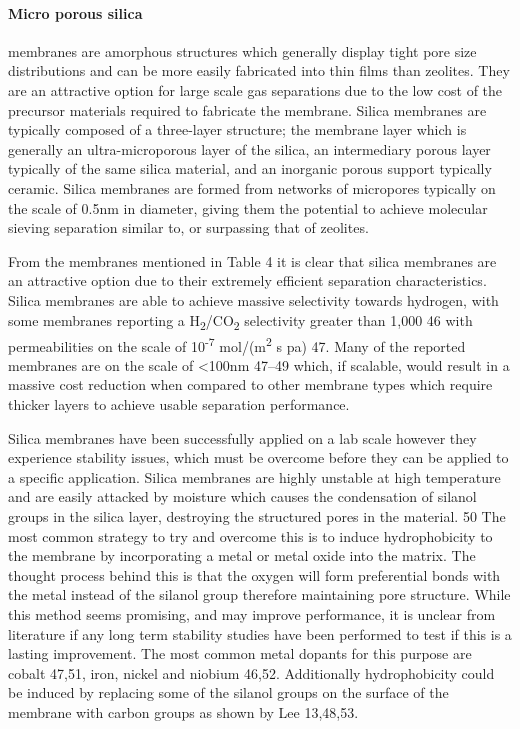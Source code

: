 \paragraph{Micro porous silica} membranes are amorphous structures which generally display tight pore 
size distributions and can be more easily fabricated into thin films than zeolites. They 
are an attractive option for large scale gas separations due to the low cost of the precursor 
materials required to fabricate the membrane. Silica membranes are typically composed of a 
three-layer structure; the membrane layer which is generally an ultra-microporous layer of 
the silica, an intermediary porous layer typically of the same silica material, and an 
inorganic porous support typically ceramic. Silica membranes are formed from networks of 
micropores typically on the scale of 0.5nm in diameter, giving them the potential to achieve 
molecular sieving separation similar to, or surpassing that of zeolites. 

From the membranes mentioned in Table 4 it is clear that silica membranes are an attractive 
option due to their extremely efficient separation characteristics. Silica membranes are able 
to achieve massive selectivity towards hydrogen, with some membranes reporting a H\textsubscript{2}/CO\textsubscript{2} 
selectivity greater than 1,000 46 with permeabilities on the scale of 10\textsuperscript{-7} mol/(m\textsuperscript{2} s pa) 
47. Many of the reported membranes are on the scale of \textless 100nm 47–49 which, if scalable, 
would result in a massive cost reduction when compared to other membrane types which require 
thicker layers to achieve usable separation performance. 

Silica membranes have been successfully applied on a lab scale however they experience 
stability issues, which must be overcome before they can be applied to a specific application. 
Silica membranes are highly unstable at high temperature and are easily attacked by moisture 
which causes the condensation of silanol groups in the silica layer, destroying the structured 
pores in the material. 50 The most common strategy to try and overcome this is to induce 
hydrophobicity to the membrane by incorporating a metal or metal oxide into the matrix.  
The thought process behind this is that the oxygen will form preferential bonds with the 
metal instead of the silanol group therefore maintaining pore structure. While this method 
seems promising, and may improve performance, it is unclear from literature if any long term 
stability studies have been performed to test if this is a lasting improvement. The most 
common metal dopants for this purpose are cobalt 47,51, iron, nickel and niobium 46,52. 
Additionally hydrophobicity could be induced by replacing some of the silanol groups on the 
surface of the membrane with carbon groups as shown by Lee 13,48,53. 

